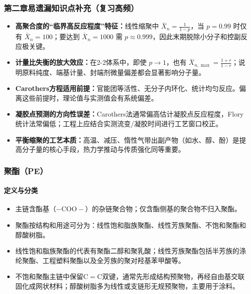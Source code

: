 ﻿\documentclass[12pt,a4paper]{article}
\begin{document}
\subsubsection{第二章易遗漏知识点补充（复习高频）}
\begin{itemize}
  \item \textbf{高聚合度的“临界高反应程度”特征：}线性缩聚中 $\bar{X}_n=\frac{1}{1-p}$，当 $p=0.99$ 时仅有 $\bar{X}_n=100$；要达到 $\bar{X}_n=1000$ 需 $p\approx 0.999$，因此末期脱除小分子和控副反应极关键。
  \item \textbf{计量比失衡的放大效应：}在2-2体系中，即使 $p\to 1$，也有 $\bar{X}_{n,\max}=\frac{1+r}{1-r}$；说明原料纯度、端基计量、封端剂微量偏差都会显著影响分子量。
  \item \textbf{Carothers方程适用前提：}官能团等活性、无分子内环化、统计均匀反应。偏离这些前提时，理论值与实测值会有系统偏差。
  \item \textbf{凝胶点预测的方向性误差：}Carothers法通常偏高估计凝胶点反应程度，Flory统计法常偏低；工程上应结合实测流变/凝胶时间进行工艺窗口校正。
  \item \textbf{平衡缩聚的工艺本质：}高温、减压、惰性气带出副产物（如水、醇、酚）是提高分子量的核心手段，热力学推动与传质强化同等重要。
\end{itemize}

\subsubsection{聚酯（PE）}
\paragraph{定义与分类}
\begin{itemize}
  \item 主链含酯基（$-\mathrm{COO}-$）的杂链聚合物；仅含酯侧基的聚合物不归入聚酯。
  \item 聚酯按结构和用途可分为：线性饱和脂族聚酯、线性芳族聚酯、不饱和聚酯和醇酸树脂。
  \item 线性饱和脂族聚酯的代表有聚酯二醇和聚乳酸；线性芳族聚酯包括半芳族的涤纶聚酯、工程塑料聚酯以及全芳族的聚对羟基苯甲酸等。
  \item 不饱和聚酯主链中保留$\mathrm{C=C}$双键，通常先形成结构预聚物，再经自由基交联固化成网状材料；醇酸树脂多为线性或支链形无规预聚物，主要用于涂料。
\end{itemize}
\end{document}
